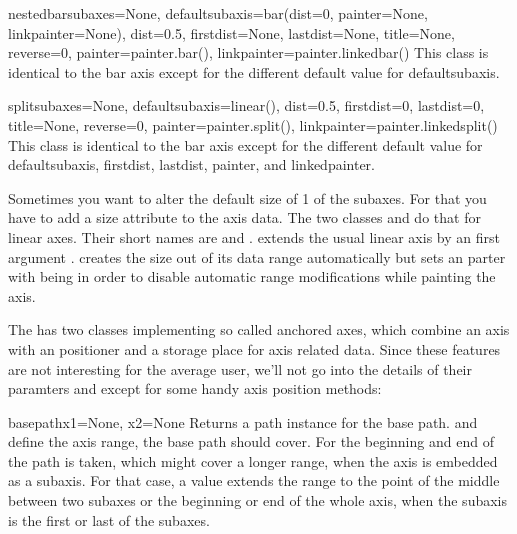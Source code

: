 \begin{classdesc}{nestedbar}{subaxes=None,
                             defaultsubaxis=bar(dist=0, painter=None, linkpainter=None),
                             dist=0.5, firstdist=None, lastdist=None,
                             title=None, reverse=0,
                             painter=painter.bar(),
                             linkpainter=painter.linkedbar()}
   This class is identical to the bar axis except for the different
   default value for defaultsubaxis.
\end{classdesc}

\begin{classdesc}{split}{subaxes=None,
                         defaultsubaxis=linear(),
                         dist=0.5, firstdist=0, lastdist=0,
                         title=None, reverse=0,
                         painter=painter.split(),
                         linkpainter=painter.linkedsplit()}
   This class is identical to the bar axis except for the different
   default value for defaultsubaxis, firstdist, lastdist, painter, and
   linkedpainter.
\end{classdesc}

Sometimes you want to alter the default size of 1 of the subaxes. For
that you have to add a size attribute to the axis data. The two
classes  and  do that for
linear axes. Their short names are  and
.  extends the usual linear
axis by an first argument .  creates
the size out of its data range automatically but sets an
 parter with  being  in
order to disable automatic range modifications while painting the
axis.

The  has two classes implementing so called anchored
axes, which combine an axis with an positioner and a storage place for
axis related data. Since these features are not interesting for the
average \PyX{} user, we'll not go into the details of their paramters
and except for some handy axis position methods:

\begin{methoddesc}[anchoredaxis]{basepath}{x1=None, x2=None}
  Returns a path instance for the base path.  and 
  define the axis range, the base path should cover. For 
  the beginning and end of the path is taken, which might cover a
  longer range, when the axis is embedded as a subaxis. For that case,
  a  value extends the range to the point of the middle
  between two subaxes or the beginning or end of the whole axis, when
  the subaxis is the first or last of the subaxes.
\end{methoddesc}

